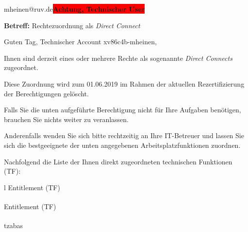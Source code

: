 \documentclass[a4paper,landscape,12pt]{letter}
\begin{document}
\begin{letter}{mheinen@ruv.de\space\space\space\space\space\space\space\space\space\bfseries\colorbox{red}{Achtung, Technischer User}\hfill \break}
\begin{normalsize}
	\opening{\textbf{Betreff:} Rechtezuordnung als \emph{Direct Connect}}
	\begin{normalsize} \hfill
	\end{normalsize}

	\begin{normalsize}
		Guten Tag, 
	Technischer Account xv86c4b-mheinen, \hfill \break
	\end{normalsize}
	\end{normalsize}
	
\begin{normalsize}
	Ihnen sind derzeit eines oder mehrere Rechte als sogenannte \emph{Direct Connects} zugeordnet.
	
	Diese Zuordnung wird zum 01.06.2019 im Rahmen der aktuellen Rezertifizierung der Berechtigungen gelöscht.
	
	Falls Sie die unten aufgeführte Berechtigung nicht für Ihre Aufgaben benötigen, 
	brauchen Sie nichts weiter zu veranlassen.
	
	Anderenfalls wenden Sie sich bitte rechtzeitig an Ihre IT-Betreuer 
	und lassen Sie sich die bestgeeignete der unten angegebenen Arbeitsplatzfunktionen zuordnen.
	\end{normalsize}
	
\begin{normalsize}
	Nachfolgend die Liste der Ihnen direkt zugeordneten technischen Funktionen (TF):

	\begin{longtable}{l}
		Entitlement (TF) \\ \hline
		\endfirsthead
		\\\hline
		Entitlement (TF) \\ \hline
		\endhead %
		\multicolumn{1}{r@{}}{Fortsetzung \ldots}\\
		\endfoot
		\hline
		\endlastfoot
	tzabas\\
	\end{longtable}
	\end{normalsize}
	

\end{letter}
\end{document}
